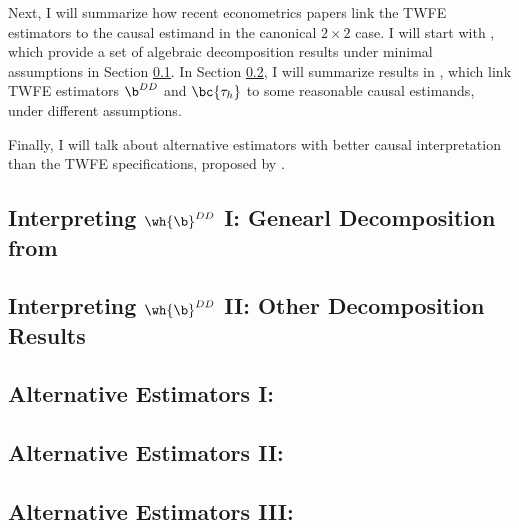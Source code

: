 \documentclass[12pt]{article}
\newcommand{\CiteReference}{reference.bib}
\newcommand{\highlightP}[1]{{\emph{\color{MyPink}{#1}}}}
\theoremstyle{definition}
\begin{document}
Next, I will summarize how recent econometrics papers link the TWFE estimators to the causal estimand in the canonical $2 \times 2$ case. I will start with \citet{goodman-baconDifferenceinDifferencesVariationTreatment2021}, which provide a set of algebraic decomposition results under minimal assumptions in Section \ref{subsec_general_decomposition}. In Section \ref{subsec_other_decomposition}, I will summarize results in \citet{borusyakRevisitingEventStudyDesigns2024,atheyDesignBasedAnalysisDifferenceinDifferences2022a,dechaisemartinTwoWayFixedEffects2020}, which link TWFE estimators ${\b}^{DD}$ and $\bc{\tau_{h}}$ to some reasonable causal estimands, under different assumptions.

Finally, I will talk about alternative estimators with better causal interpretation than the TWFE specifications, proposed by \citet{borusyakRevisitingEventStudyDesigns2024, callawayDifferenceinDifferencesMultipleTime2021, sunEstimatingDynamicTreatment2021}.

\subsection{Interpreting $\wh{\b}^{DD}$ I: Genearl Decomposition from \citet{goodman-baconDifferenceinDifferencesVariationTreatment2021}} \label{subsec_general_decomposition}

\highlightP{TO BE SUMMARIZED FROM THE PAPER NOTES}

\subsection{Interpreting $\wh{\b}^{DD}$ II: Other Decomposition Results} \label{subsec_other_decomposition}

\highlightP{TO BE SUMMARIZED FROM THE PAPER NOTES}

\subsection{Alternative Estimators I: \citet{borusyakRevisitingEventStudyDesigns2024}}

\highlightP{TO BE SUMMARIZED FROM THE PAPER NOTES}

\subsection{Alternative Estimators II: \citet{callawayDifferenceinDifferencesMultipleTime2021}}

\highlightP{TO BE SUMMARIZED FROM THE PAPER NOTES}

\subsection{Alternative Estimators III: \citet{sunEstimatingDynamicTreatment2021}}


\highlightP{TO BE SUMMARIZED}



\newpage

\end{document}

